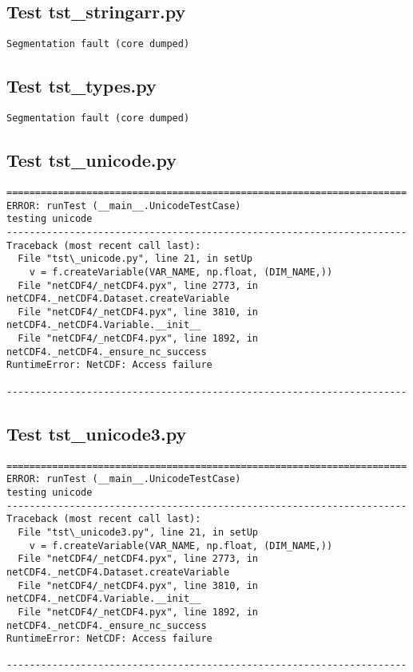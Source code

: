 \begin{verbatim}

\end{verbatim}

\subsection{Test tst\_stringarr.py}

\begin{verbatim}
Segmentation fault (core dumped)
\end{verbatim}

\subsection{Test tst\_types.py}

\begin{verbatim}
Segmentation fault (core dumped)
\end{verbatim}

\subsection{Test tst\_unicode.py}

\begin{verbatim}
======================================================================
ERROR: runTest (__main__.UnicodeTestCase)
testing unicode
----------------------------------------------------------------------
Traceback (most recent call last):
  File "tst\_unicode.py", line 21, in setUp
    v = f.createVariable(VAR_NAME, np.float, (DIM_NAME,))
  File "netCDF4/_netCDF4.pyx", line 2773, in netCDF4._netCDF4.Dataset.createVariable
  File "netCDF4/_netCDF4.pyx", line 3810, in netCDF4._netCDF4.Variable.__init__
  File "netCDF4/_netCDF4.pyx", line 1892, in netCDF4._netCDF4._ensure_nc_success
RuntimeError: NetCDF: Access failure

----------------------------------------------------------------------
\end{verbatim}

\subsection{Test tst\_unicode3.py}

\begin{verbatim}
======================================================================
ERROR: runTest (__main__.UnicodeTestCase)
testing unicode
----------------------------------------------------------------------
Traceback (most recent call last):
  File "tst\_unicode3.py", line 21, in setUp
    v = f.createVariable(VAR_NAME, np.float, (DIM_NAME,))
  File "netCDF4/_netCDF4.pyx", line 2773, in netCDF4._netCDF4.Dataset.createVariable
  File "netCDF4/_netCDF4.pyx", line 3810, in netCDF4._netCDF4.Variable.__init__
  File "netCDF4/_netCDF4.pyx", line 1892, in netCDF4._netCDF4._ensure_nc_success
RuntimeError: NetCDF: Access failure

----------------------------------------------------------------------
\end{verbatim}

